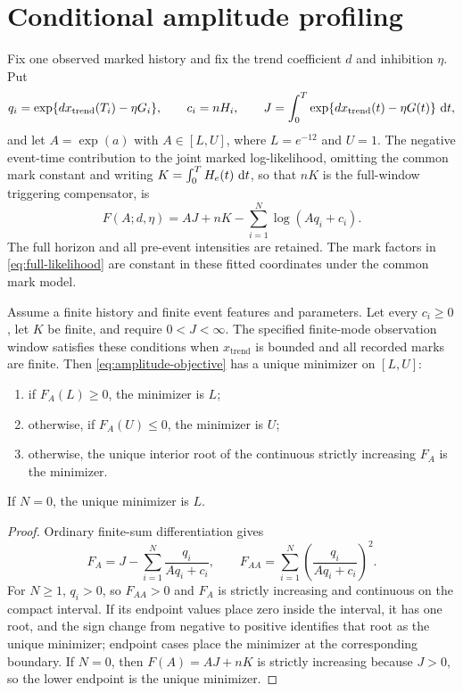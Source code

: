 \section{Conditional amplitude profiling}

Fix one observed marked history and fix the trend coefficient \(d\) and inhibition \(\eta\). Put
\[
q_i=\exp\{d x_{\mathrm{trend}}(T_i)-\eta G_i\},
\qquad
c_i=nH_i,
\qquad
J=\int_0^T\exp\{d x_{\mathrm{trend}}(t)-\eta G(t)\}\,\mathop{}\!\mathrm{d} t,
\]
and let \(A=\exp(a)\) with \(A\in[L,U]\), where \(L=e^{-12}\) and \(U=1\). The negative event-time contribution to the joint marked log-likelihood, omitting the common mark constant and writing \(K=\int_0^T H_e(t)\,\mathop{}\!\mathrm{d} t\), so that \(nK\) is the full-window triggering compensator, is
\begin{equation}
F(A;d,\eta)=AJ+nK-\sum_{i=1}^{N}\log(Aq_i+c_i).
\label{eq:amplitude-objective}
\end{equation}
The full horizon and all pre-event intensities are retained. The mark factors in \eqref{eq:full-likelihood} are constant in these fitted coordinates under the common mark model.

\begin{proposition}
\label{prop:amplitude}
Assume a finite history and finite event features and parameters. Let every \(c_i\ge0\), let \(K\) be finite, and require \(0<J<\infty\). The specified finite-mode observation window satisfies these conditions when \(x_{\mathrm{trend}}\) is bounded and all recorded marks are finite. Then \eqref{eq:amplitude-objective} has a unique minimizer on \([L,U]\):
\begin{enumerate}
\item if \(F_A(L)\ge0\), the minimizer is \(L\);
\item otherwise, if \(F_A(U)\le0\), the minimizer is \(U\);
\item otherwise, the unique interior root of the continuous strictly increasing \(F_A\) is the minimizer.
\end{enumerate}
If \(N=0\), the unique minimizer is \(L\).
\end{proposition}

\begin{proof}
Ordinary finite-sum differentiation gives
\[
F_A=J-\sum_{i=1}^{N}\frac{q_i}{Aq_i+c_i},
\qquad
F_{AA}=\sum_{i=1}^{N}
\left(\frac{q_i}{Aq_i+c_i}\right)^2.
\]
For \(N\ge1\), \(q_i>0\), so \(F_{AA}>0\) and \(F_A\) is strictly increasing and continuous on the compact interval. If its endpoint values place zero inside the interval, it has one root, and the sign change from negative to positive identifies that root as the unique minimizer; endpoint cases place the minimizer at the corresponding boundary. If \(N=0\), then \(F(A)=AJ+nK\) is strictly increasing because \(J>0\), so the lower endpoint is the unique minimizer.
\end{proof}

